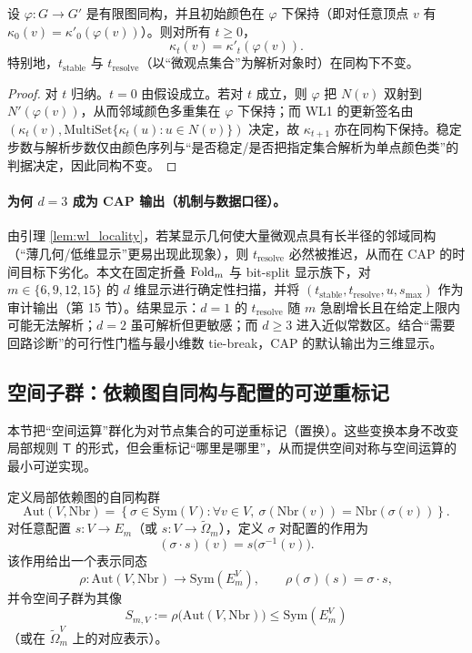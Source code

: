 \begin{lemma}[WL1 指标对图同构不变]\label{lem:wl_iso_invariant}
\MathTag
设 $\varphi:G\to G'$ 是有限图同构，并且初始颜色在 $\varphi$ 下保持（即对任意顶点 $v$ 有 $\kappa_0(v)=\kappa'_0(\varphi(v))$）。则对所有 $t\ge 0$，
$$
\kappa_t(v)=\kappa'_t(\varphi(v)).
$$
特别地，$t_{\mathrm{stable}}$ 与 $t_{\mathrm{resolve}}$（以“微观点集合”为解析对象时）在同构下不变。
\end{lemma}

\begin{proof}
\MathTag
对 $t$ 归纳。$t=0$ 由假设成立。若对 $t$ 成立，则 $\varphi$ 把 $N(v)$ 双射到 $N'(\varphi(v))$，从而邻域颜色多重集在 $\varphi$ 下保持；而 WL1 的更新签名由 $(\kappa_t(v),\mathrm{MultiSet}\{\kappa_t(u):u\in N(v)\})$ 决定，故 $\kappa_{t+1}$ 亦在同构下保持。稳定步数与解析步数仅由颜色序列与“是否稳定/是否把指定集合解析为单点颜色类”的判据决定，因此同构不变。
\end{proof}

\paragraph{为何 $d=3$ 成为 CAP 输出（机制与数据口径）。}
\AuditTag
由引理 \ref{lem:wl_locality}，若某显示几何使大量微观点具有长半径的邻域同构（“薄几何/低维显示”更易出现此现象），则 $t_{\mathrm{resolve}}$ 必然被推迟，从而在 CAP 的时间目标下劣化。本文在固定折叠 $\mathrm{Fold}_m$ 与 bit-split 显示族下，对 $m\in\{6,9,12,15\}$ 的 $d$ 维显示进行确定性扫描，并将 $(t_{\mathrm{stable}},t_{\mathrm{resolve}},u,s_{\max})$ 作为审计输出（第 15 节）。结果显示：$d=1$ 的 $t_{\mathrm{resolve}}$ 随 $m$ 急剧增长且在给定上限内可能无法解析；$d=2$ 虽可解析但更敏感；而 $d\ge 3$ 进入近似常数区。结合“需要回路诊断”的可行性门槛与最小维数 tie-break，CAP 的默认输出为三维显示。

\subsection{空间子群：依赖图自同构与配置的可逆重标记}

本节把“空间运算”群化为对节点集合的可逆重标记（置换）。这些变换本身不改变局部规则 $\mathsf T$ 的形式，但会重标记“哪里是哪里”，从而提供空间对称与空间运算的最小可逆实现。

\begin{definition}[依赖图自同构群与空间作用]\label{def:space-automorphism-group}
定义局部依赖图的自同构群
$$
\mathrm{Aut}(V,\mathrm{Nbr})=\left\{\sigma\in \mathrm{Sym}(V):\forall v\in V,\ \sigma(\mathrm{Nbr}(v))=\mathrm{Nbr}(\sigma(v))\right\}.
$$
对任意配置 $s:V\to E_m$（或 $s:V\to \widetilde{\Omega}_m$），定义 $\sigma$ 对配置的作用为
$$
(\sigma\cdot s)(v)=s\bigl(\sigma^{-1}(v)\bigr).
$$
该作用给出一个表示同态
$$
\rho:\mathrm{Aut}(V,\mathrm{Nbr})\to \mathrm{Sym}(E_m^V),
\qquad
\rho(\sigma)(s)=\sigma\cdot s,
$$
并令空间子群为其像
$$
S_{m,V}:=\rho\bigl(\mathrm{Aut}(V,\mathrm{Nbr})\bigr)\le \mathrm{Sym}(E_m^V)
$$
（或在 $\widetilde{\Omega}_m^V$ 上的对应表示）。
\end{definition}

